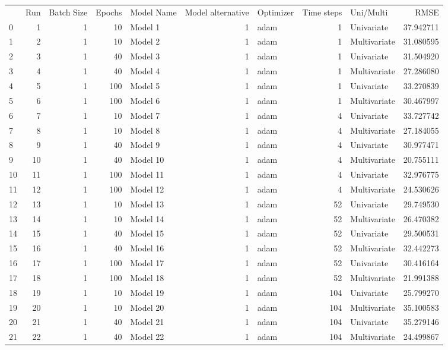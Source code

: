 \begin{tabular}{lrrrlrlrlr}
 & Run & Batch Size & Epochs & Model Name & Model alternative & Optimizer & Time steps & Uni/Multi & RMSE \\
0 & 1 & 1 & 10 & Model 1 & 1 & adam & 1 & Univariate & 37.942711 \\
1 & 2 & 1 & 10 & Model 2 & 1 & adam & 1 & Multivariate & 31.080595 \\
2 & 3 & 1 & 40 & Model 3 & 1 & adam & 1 & Univariate & 31.504920 \\
3 & 4 & 1 & 40 & Model 4 & 1 & adam & 1 & Multivariate & 27.286080 \\
4 & 5 & 1 & 100 & Model 5 & 1 & adam & 1 & Univariate & 33.270839 \\
5 & 6 & 1 & 100 & Model 6 & 1 & adam & 1 & Multivariate & 30.467997 \\
6 & 7 & 1 & 10 & Model 7 & 1 & adam & 4 & Univariate & 33.727742 \\
7 & 8 & 1 & 10 & Model 8 & 1 & adam & 4 & Multivariate & 27.184055 \\
8 & 9 & 1 & 40 & Model 9 & 1 & adam & 4 & Univariate & 30.977471 \\
9 & 10 & 1 & 40 & Model 10 & 1 & adam & 4 & Multivariate & 20.755111 \\
10 & 11 & 1 & 100 & Model 11 & 1 & adam & 4 & Univariate & 32.976775 \\
11 & 12 & 1 & 100 & Model 12 & 1 & adam & 4 & Multivariate & 24.530626 \\
12 & 13 & 1 & 10 & Model 13 & 1 & adam & 52 & Univariate & 29.749530 \\
13 & 14 & 1 & 10 & Model 14 & 1 & adam & 52 & Multivariate & 26.470382 \\
14 & 15 & 1 & 40 & Model 15 & 1 & adam & 52 & Univariate & 29.500531 \\
15 & 16 & 1 & 40 & Model 16 & 1 & adam & 52 & Multivariate & 32.442273 \\
16 & 17 & 1 & 100 & Model 17 & 1 & adam & 52 & Univariate & 30.416164 \\
17 & 18 & 1 & 100 & Model 18 & 1 & adam & 52 & Multivariate & 21.991388 \\
18 & 19 & 1 & 10 & Model 19 & 1 & adam & 104 & Univariate & 25.799270 \\
19 & 20 & 1 & 10 & Model 20 & 1 & adam & 104 & Multivariate & 35.100583 \\
20 & 21 & 1 & 40 & Model 21 & 1 & adam & 104 & Univariate & 35.279146 \\
21 & 22 & 1 & 40 & Model 22 & 1 & adam & 104 & Multivariate & 24.499867 \\

\end{tabular}

